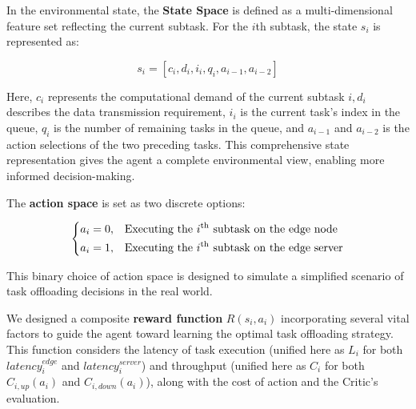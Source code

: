 \documentclass[preprint,12pt]{elsarticle}
\begin{document}
In the environmental state, the \textbf{State Space} is defined as a multi-dimensional feature set reflecting the current subtask. For the \(i\)th subtask, the state \(s_i\) is represented as:

\begin{equation}
    s_i=[c_i,d_i,i_i,q_i,a_{i-1},a_{i-2} ]
\end{equation}

Here, \(c_i\) represents the computational demand of the current subtask \(i,d_i\) describes the data transmission requirement, \(i_i\) is the current task's index in the queue, \(q_i\) is the number of remaining tasks in the queue, and \(a_{i-1}\) and \(a_{i-2}\) is the action selections of the two preceding tasks. This comprehensive state representation gives the agent a complete environmental view, enabling more informed decision-making.

The \textbf{action space} is set as two discrete options:


\begin{equation}
    \label{eq:17}
    \left\{
        \begin{aligned}
            &a_i=0, && \text{Executing the } i\textsuperscript{th} \text{ subtask on the edge node}\\
            &a_i=1, && \text{Executing the } i\textsuperscript{th} \text{ subtask on the edge server}
        \end{aligned}
    \right.
\end{equation}



This binary choice of action space is designed to simulate a simplified scenario of task offloading decisions in the real world.

We designed a composite \textbf{reward function} \(R(s_i,a_i)\) incorporating several vital factors to guide the agent toward learning the optimal task offloading strategy. This function considers the latency of task execution (unified here as \(L_i\) for both \(latency_i^{edge}\) and \(latency_i^{server}\))  and throughput (unified here as \(C_i\) for both \(C_{i, up} (a_i)\) and \(C_{i, down} (a_i)\)), along with the cost of action and the Critic's evaluation.
\end{document}
